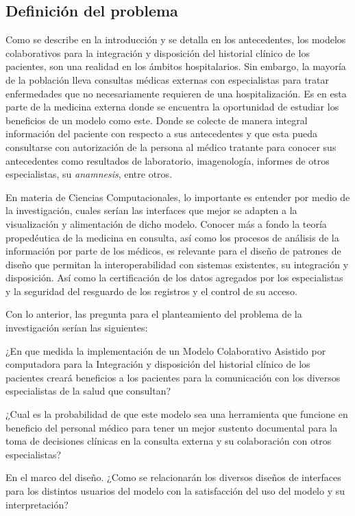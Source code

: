     \subsection{Definición del problema}

    Como se describe en la introducción y se detalla en los antecedentes, los modelos colaborativos para la integración y disposición del historial clínico de los pacientes, son una realidad en los ámbitos hospitalarios. Sin embargo, la mayoría de la población lleva consultas médicas externas con especialistas para tratar enfermedades que no necesariamente requieren de una hospitalización. Es en esta parte de la medicina externa donde se encuentra la oportunidad de estudiar los beneficios de un modelo como este. Donde se colecte de manera integral información del paciente con respecto a sus antecedentes y que esta pueda consultarse con autorización de la persona al médico tratante para conocer sus antecedentes como resultados de laboratorio, imagenología, informes de otros especialistas, su \emph{anamnesis}, entre otros.

    En materia de Ciencias Computacionales, lo importante es entender por medio de la investigación, cuales serían las interfaces que mejor se adapten a la visualización y alimentación de dicho modelo. Conocer más a fondo la teoría propedéutica de la medicina en consulta, así como los procesos de análisis de la información por parte de los médicos, es relevante para el diseño de patrones de diseño que permitan la interoperabilidad con sistemas existentes, su integración y disposición. Así como la certificación de los datos agregados por los especialistas y la seguridad del resguardo de los registros y el control de su acceso.

    Con lo anterior, las pregunta para el planteamiento del problema de la investigación serían las siguientes:

    ¿En que medida la implementación de un Modelo Colaborativo Asistido por computadora para la Integración y disposición del historial clínico de los pacientes creará beneficios a los pacientes para la comunicación con los diversos especialistas de la salud que consultan?

    ¿Cual es la probabilidad de que este modelo sea una herramienta que funcione en beneficio del personal médico para tener un mejor sustento documental para la toma de decisiones clínicas en la consulta externa y su colaboración con otros especialistas?

    En el marco del diseño. ¿Como se relacionarán los diversos diseños de interfaces para los distintos usuarios del modelo con la satisfacción del uso del modelo y su interpretación?

